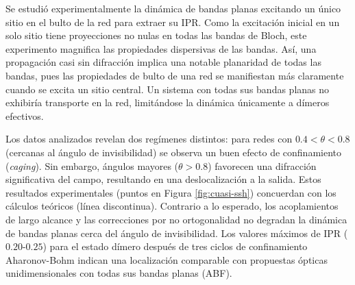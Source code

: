Se estudió experimentalmente la dinámica de bandas planas excitando un único sitio en el bulto de la red para extraer su IPR. Como la excitación inicial en un solo sitio tiene proyecciones no nulas en todas las bandas de Bloch, este experimento magnifica las propiedades dispersivas de las bandas. Así, una propagación casi sin difracción implica una notable planaridad de todas las bandas, pues las propiedades de bulto de una red se manifiestan más claramente cuando se excita un sitio central. Un sistema con todas sus bandas planas no exhibiría transporte en la red, limitándose la dinámica únicamente a dímeros efectivos.

Los datos analizados revelan dos regímenes distintos: para redes con $0.4 < \theta < 0.8$ (cercanas al ángulo de invisibilidad) se observa un buen efecto de confinamiento (\emph{caging}). Sin embargo, ángulos mayores ($\theta > 0.8$) favorecen una difracción significativa del campo, resultando en una deslocalización a la salida. Estos resultados experimentales (puntos en Figura \ref{fig:cuasi-ssh}) concuerdan con los cálculos teóricos (línea discontinua). Contrario a lo esperado, los acoplamientos de largo alcance y las correcciones por no ortogonalidad no degradan la dinámica de bandas planas cerca del ángulo de invisibilidad. Los valores máximos de IPR ($0.20$-$0.25$) para el estado dímero después de tres ciclos de confinamiento Aharonov-Bohm indican una localización comparable con propuestas ópticas unidimensionales con todas sus bandas planas (ABF). 
